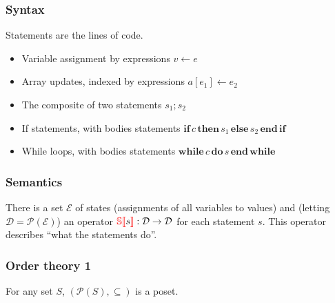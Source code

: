 \documentclass[usepdftitle=false]{beamer}
\newcommand{\stateset}[0]{\mathcal{E}}
\newcommand{\concdomain}[0]{\mathcal{D}}
\newcommand{\statement}[1]{\textcolor{red}{\mathbb{S}\llbracket} #1 \textcolor{red}{\rrbracket}}
\newcommand{\ite}[3]{\mathbf{if} \, #1 \, \mathbf{then} \, #2 \, \mathbf{else} \, #3 \, \mathbf{end\,if}}
\newcommand{\while}[2]{\mathbf{while} \, #1 \, \mathbf{do} \, #2 \, \mathbf{end\,while}}
\begin{document}
\begin{frame}
    \frametitle{Syntax}
    Statements are the lines of code.
    \begin{itemize}
        \item<2->
            Variable assignment by expressions \(v \gets e\)
        \item<3->
            Array updates, indexed by expressions \(a[e_1] \gets e_2\)
        \item<4->
            The composite of two statements \(s_1; s_2\)
        \item<5->
            If statements, with bodies statements \(\ite{c}{s_1}{s_2}\)
        \item<6->
            While loops, with bodies statements \(\while{c}{s}\)
    \end{itemize}
\end{frame}

\begin{frame}
    \frametitle{Semantics}
    There is a set \(\stateset\) of states (assignments of all variables to values) and (letting \(\concdomain = \mathcal{P}(\stateset)\)) an operator \(\statement{s} : \concdomain \to \concdomain\) for each statement \(s\).
    This operator describes ``what the statements do''.

    \uncover<2->{
        For example,
        \[
            \statement{x \gets 5}(\stateset) = \{\sigma \in \stateset \mid \sigma(x) = 5\}.
        \]
    }

\end{frame}

\begin{frame}
    \frametitle{Order theory 1}
    For any set \(S\), \((\mathcal{P}(S), \subseteq)\) is a poset.

\end{frame}
\end{document}
